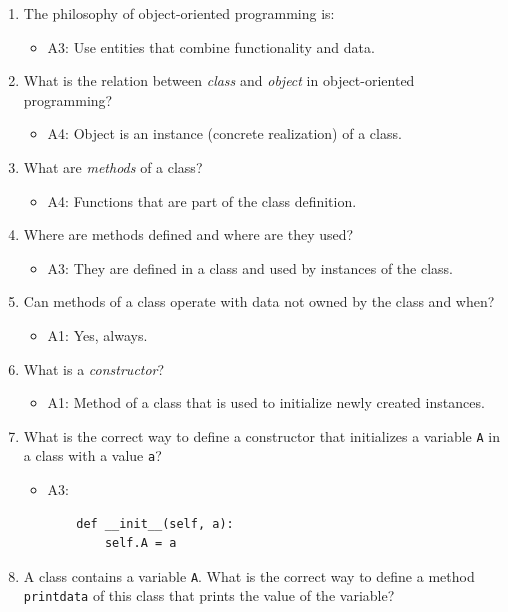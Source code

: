 \documentclass[article,A4,12pt]{llncs}
\begin{document}
\begin{enumerate}
\item The philosophy of object-oriented programming is:
  \begin{itemize}
    \item A3: Use entities that combine functionality and data.
  \end{itemize}
\item What is the relation between {\em class} and {\em object} in object-oriented programming?
  \begin{itemize}
    \item A4: Object is an instance (concrete realization) of a class.
  \end{itemize}
\item What are {\em methods} of a class?
  \begin{itemize}
    \item A4: Functions that are part of the class definition.
  \end{itemize}
\item Where are methods defined and where are they used?
  \begin{itemize}
    \item A3: They are defined in a class and used by instances of the class.
  \end{itemize}
\item Can methods of a class operate with data not owned by the class and when?
  \begin{itemize}
    \item A1: Yes, always.
  \end{itemize}
\item What is a {\em constructor}?
  \begin{itemize}
    \item A1: Method of a class that is used to initialize newly created instances.
  \end{itemize}
\item What is the correct way to define a constructor that initializes a variable
      {\tt A} in a class with a value {\tt a}?
  \begin{itemize}
    \item A3:
\begin{verbatim}
    def __init__(self, a):
        self.A = a
\end{verbatim}
  \end{itemize}
\item A class contains a variable {\tt A}. What is the correct way to define 
      a method {\tt printdata} of this class that prints the value of the variable?

\end{enumerate}
\end{document}

